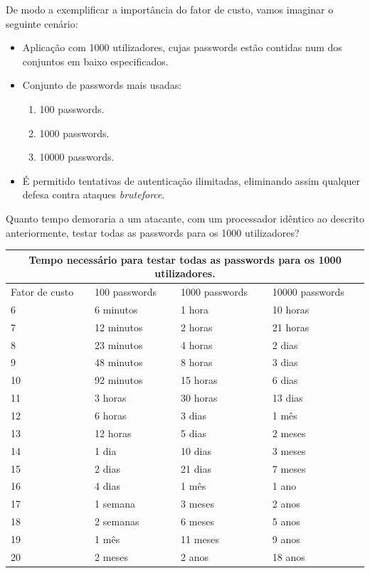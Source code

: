 De modo a exemplificar a importância do fator de custo, vamos imaginar o seguinte cenário:

\begin{itemize}
    \item Aplicação com 1000 utilizadores, cujas passwords estão contidas num dos conjuntos em baixo especificados.
    \item Conjunto de passwords mais usadas:
    \begin{enumerate}
        \item 100 passwords.
        \item 1000 passwords.
        \item 10000 passwords.
    \end{enumerate}
    \item É permitido tentativas de autenticação ilimitadas, eliminando assim qualquer defesa contra ataques \emph{bruteforce}.
\end{itemize}

Quanto tempo demoraria a um atacante, com um processador idêntico ao descrito anteriormente, testar todas as passwords para os 1000 utilizadores?

\begin{center}
    \begin{tabular}{ |p{2.5cm}|p{3cm}|p{3cm}|p{3cm}|  }
        \hline
        \multicolumn{4}{|c|}{Tempo necessário para testar todas as passwords para os 1000 utilizadores.} \\
        \hline
        Fator de custo & 100 passwords & 1000 passwords & 10000 passwords\\
        \hline 
        6 & 6 minutos & 1 hora & 10 horas\\
        7 & 12 minutos & 2 horas & 21 horas\\
        8 & 23 minutos & 4 horas & 2 dias\\
        9 & 48 minutos & 8 horas & 3 dias\\
        10 & 92 minutos & 15 horas & 6 dias\\
        11 & 3 horas & 30 horas & 13 dias\\
        12 & 6 horas & 3 dias & 1 mês\\
        13 & 12 horas & 5 dias & 2 meses\\
        14 & 1 dia & 10 dias & 3 meses\\
        15 & 2 dias & 21 dias & 7 meses\\
        16 & 4 dias & 1 mês & 1 ano\\
        17 & 1 semana & 3 meses & 2 anos\\
        18 & 2 semanas & 6 meses & 5 anos\\
        19 & 1 mês & 11 meses & 9 anos\\
        20 & 2 meses & 2 anos & 18 anos\\
        \hline
    \end{tabular}
\label{tab:bcrypt_bruteforce} 
\end{center}

